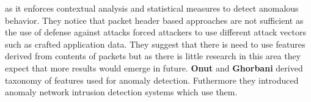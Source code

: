 as it enforces contextual analysis and statistical measures to detect anomalous behavior. They notice that
packet header based approaches are not sufficient as the use of defense against attacks forced attackers 
to use different attack vectors such as crafted application data. They suggest that there is need to use 
features derived from contents of packets but as there is little research in this area they expect that
more results would emerge in future.
%
\textbf{Onut} and \textbf{Ghorbani} \cite{onut2007feature} derived taxonomy of features used for anomaly detection.
Futhermore they introduced anomaly network intrusion detection systems which use them.
%
%
